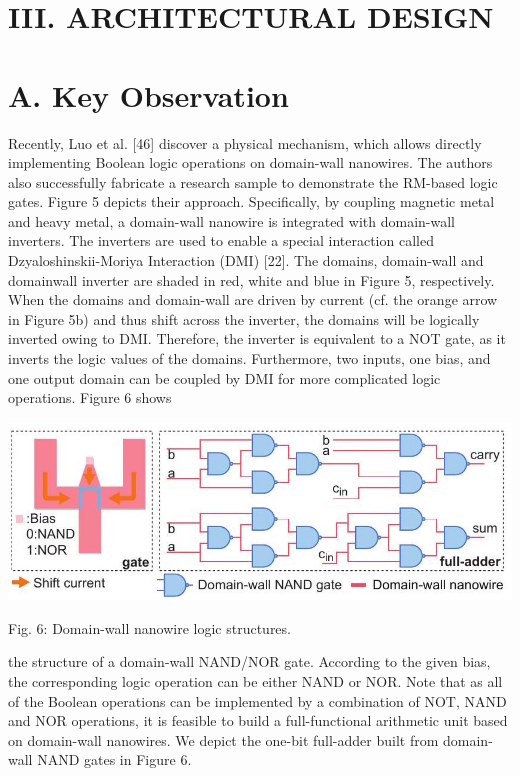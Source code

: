 \documentclass[10pt]{article}
\begin{document}
\section*{III. ARCHITECTURAL DESIGN}
\section*{A. Key Observation}
Recently, Luo et al. [46] discover a physical mechanism, which allows directly implementing Boolean logic operations on domain-wall nanowires. The authors also successfully fabricate a research sample to demonstrate the RM-based logic gates. Figure 5 depicts their approach. Specifically, by coupling magnetic metal and heavy metal, a domain-wall nanowire is integrated with domain-wall inverters. The inverters are used to enable a special interaction called Dzyaloshinskii-Moriya Interaction (DMI) [22]. The domains, domain-wall and domainwall inverter are shaded in red, white and blue in Figure 5, respectively. When the domains and domain-wall are driven by current (cf. the orange arrow in Figure 5b) and thus shift across the inverter, the domains will be logically inverted owing to DMI. Therefore, the inverter is equivalent to a NOT gate, as it inverts the logic values of the domains. Furthermore, two inputs, one bias, and one output domain can be coupled by DMI for more complicated logic operations. Figure 6 shows

\begin{center}
\includegraphics[max width=\textwidth]{2024_05_12_abeba8a85da5b5ec4c7bg-04}
\end{center}

Fig. 6: Domain-wall nanowire logic structures.

the structure of a domain-wall NAND/NOR gate. According to the given bias, the corresponding logic operation can be either NAND or NOR. Note that as all of the Boolean operations can be implemented by a combination of NOT, NAND and NOR operations, it is feasible to build a full-functional arithmetic unit based on domain-wall nanowires. We depict the one-bit full-adder built from domain-wall NAND gates in Figure 6.
\end{document}

